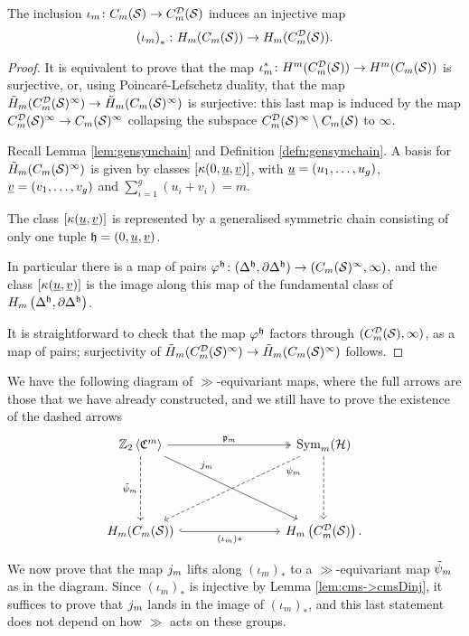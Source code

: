 \begin{lem}
 \label{lem:cms->cmsDinj}
 The inclusion $\iota_m\colon C_m(\mathcal{S})\to C_{m}^{\mathcal{D}}(\mathcal{S})$ induces an injective map
 \[
  \left(\iota_m\right)_*\colon H_m(C_m(\mathcal{S}))\to H_m(C_{m}^{\mathcal{D}}(\mathcal{S})).
 \]
\end{lem}
\begin{proof}
 It is equivalent to prove that the map $\iota_m^*\colon H^m(C_{m}^{\mathcal{D}}(\mathcal{S}))\to H^m(C_m(\mathcal{S}))$ is surjective,
 or, using Poincaré-Lefschetz duality, that the map $\tilde{H}_m(C_{m}^{\mathcal{D}}(\mathcal{S})^{\infty})\to \tilde{H}_m(C_m(\mathcal{S})^{\infty})$
 is surjective: this last map is induced by the map $C_{m}^{\mathcal{D}}(\mathcal{S})^{\infty}\to C_m(\mathcal{S})^{\infty}$ collapsing the subspace
 $C_{m}^{\mathcal{D}}(\mathcal{S})^{\infty}\setminus C_m(\mathcal{S})$ to $\infty$.
 
 Recall Lemma \ref{lem:gensymchain} and Definition \ref{defn:gensymchain}. A basis for $\tilde{H}_m(C_m(\mathcal{S})^{\infty})$
 is given by classes $[\kappa(0,\underline{u},\underline{v})]$, with
 $\underline{u}=(u_1,\dots, u_g)$, $\underline{v}=(v_1,\dots,v_g)$ and
 $\sum_{i=1}^g (u_i+v_i)=m$.
 
 The class $[\kappa(\underline{u},\underline{v})]$ is represented by a generalised symmetric chain consisting of only one tuple $\mathfrak{h}=(0,\underline{u},\underline{v})$.
 
 In particular there is a map of pairs
 $\varphi^{\mathfrak{h}}\colon(\Delta^{\mathfrak{h}},\partial\Delta^{\mathfrak{h}})\to (C_m(\mathcal{S})^{\infty},\infty)$, and the class $[\kappa(\underline{u},\underline{v})]$
 is the image along this map of the fundamental class of $H_m\left(\Delta^{\mathfrak{h}},\partial\Delta^{\mathfrak{h}}\right)$.
 
 It is straightforward to check that the map $\varphi^{\mathfrak{h}}$ factors through
 $(C_{m}^{\mathcal{D}}(\mathcal{S}),\infty)$, as a map of pairs; surjectivity of $\tilde{H}_m(C_{m}^{\mathcal{D}}(\mathcal{S})^{\infty})\to \tilde{H}_m(C_m(\mathcal{S})^{\infty})$ follows.
\end{proof}

We have the following diagram of $\gg$-equivariant maps, where the full arrows are those
that we have already constructed, and we still have to prove the existence of the dashed arrows
\begin{equation}
\label{eq:fulldasheddiagram}
\begin{tikzcd}[column sep=8em,row sep=5em]
  \ZcC{m} \ar[r,"\pr_m",two heads]\ar[d,dashed, swap, "\tpsi_m"]\ar[dr,"\j_m",near start]
  & \Sym_m(\H)\ar[d,dashed ]\ar[dl,dashed,very near start,"\psi_m"]\\
  H_m(\cms)\ar[r,swap,"\pa{\iota_m}*",hook] & H_m\pa{\cmsD}.
 \end{tikzcd}
\end{equation}

We now prove that the map $j_m$ lifts along $(\iota_m)_*$
to a $\gg$-equivariant map $\tilde\psi_m$ as in the diagram.
Since $(\iota_m)_*$ is injective by Lemma \ref{lem:cms->cmsDinj}, it suffices to prove that $j_m$
lands in the image of $(\iota_m)_*$, and this last statement does not depend on how $\gg$ acts on these groups.

